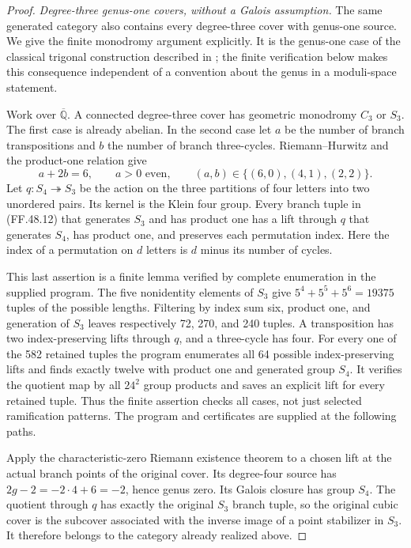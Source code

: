 \begin{proof}
\emph{Degree-three genus-one covers, without a Galois assumption.}
The same generated category also contains every degree-three
cover with genus-one source. We give the finite monodromy
argument explicitly. It is the genus-one case of the
classical trigonal construction described in
\citet[Section~9.1, Remark~9.13]{FF_RecillasRodriguez2003};
the finite verification below makes this consequence
independent of a convention about the genus in a
moduli-space statement.

Work over \(\overline{\mathbb Q}\). A connected
degree-three cover has geometric monodromy \(C_3\)
or \(S_3\). The first case is already abelian.
In the second case let \(a\) be the number of branch
transpositions and \(b\) the number of branch
three-cycles. Riemann--Hurwitz and the product-one
relation give
\[
          a+2b=6,\qquad a>0\text{ even},\qquad
          (a,b)\in\{(6,0),(4,1),(2,2)\}.
                                                        \tag{FF.48.12}
\]
Let \(q:S_4\twoheadrightarrow S_3\) be the action
on the three partitions of four letters into two
unordered pairs. Its kernel is the Klein four group.
Every branch tuple in (FF.48.12) that generates
\(S_3\) and has product one has a lift through
\(q\) that generates \(S_4\), has product one,
and preserves each permutation index. Here the index
of a permutation on \(d\) letters is \(d\) minus
its number of cycles.

This last assertion is a finite lemma verified by
complete enumeration in the supplied program. The
five nonidentity elements of \(S_3\) give
\(5^4+5^5+5^6=19375\) tuples of the possible
lengths. Filtering by index sum six, product one,
and generation of \(S_3\) leaves respectively
72, 270, and 240 tuples. A transposition has two
index-preserving lifts through \(q\), and a
three-cycle has four. For every one of the 582
retained tuples the program enumerates all 64
possible index-preserving lifts and finds exactly
twelve with product one and generated group
\(S_4\). It verifies the quotient map by all
\(24^2\) group products and saves an explicit
lift for every retained tuple. Thus the finite
assertion checks all cases, not just selected
ramification patterns. The program and certificates
are supplied at the following paths.



Apply the characteristic-zero Riemann existence
theorem to a chosen lift at the actual branch
points of the original cover. Its degree-four
source has
\(2g-2=-2\cdot4+6=-2\), hence genus zero.
Its Galois closure has group \(S_4\). The quotient
through \(q\) has exactly the original
\(S_3\) branch tuple, so the original cubic
cover is the subcover associated with the inverse
image of a point stabilizer in \(S_3\).
It therefore belongs to the category already
realized above.


\end{proof}
